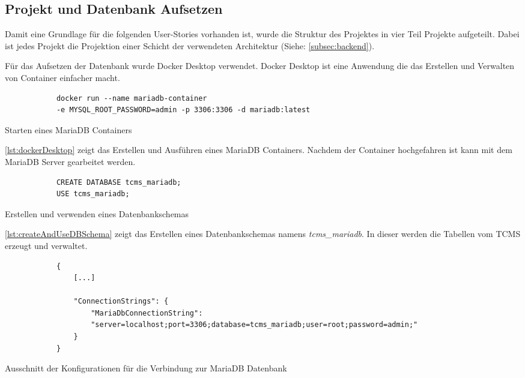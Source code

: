 \documentclass[a4paper, fontsize=11pt, parskip=half, twoside]{scrreprt}
\begin{document}
	\subsection{Projekt und Datenbank Aufsetzen}
	Damit eine Grundlage für die folgenden User-Stories vorhanden ist, wurde die Struktur des Projektes in vier Teil Projekte aufgeteilt.
	Dabei ist jedes Projekt die Projektion einer Schicht der verwendeten Architektur (Siehe: \autoref{subsec:backend}).
	
	Für das Aufsetzen der Datenbank wurde Docker Desktop verwendet.
	Docker Desktop ist eine Anwendung die das Erstellen und Verwalten von Container einfacher macht. \textcite{noauthor_docker_2022}
	
	\begin{listing}[ht]
		\begin{verbatim}
			docker run --name mariadb-container 
			-e MYSQL_ROOT_PASSWORD=admin -p 3306:3306 -d mariadb:latest
		\end{verbatim}
		\caption{Starten eines MariaDB Containers}
		\label{lst:dockerDesktop}
	\end{listing}

	\autoref{lst:dockerDesktop} zeigt das Erstellen und Ausführen eines MariaDB Containers.
	Nachdem der Container hochgefahren ist kann mit dem MariaDB Server gearbeitet werden.
	
	\begin{listing}[ht]
		\begin{verbatim}
			CREATE DATABASE tcms_mariadb; 
			USE tcms_mariadb;
		\end{verbatim}
		\caption{Erstellen und verwenden eines Datenbankschemas}
		\label{lst:createAndUseDBSchema}
	\end{listing}

	\autoref{lst:createAndUseDBSchema} zeigt das Erstellen eines Datenbankschemas namens \emph{tcms\_mariadb}. 
	In dieser werden die Tabellen vom \ac{TCMS} erzeugt und verwaltet.

	\begin{listing}[ht]
		\begin{verbatim}
			{
				[...]
				
				"ConnectionStrings": {
					"MariaDbConnectionString": 
					"server=localhost;port=3306;database=tcms_mariadb;user=root;password=admin;"
				}
			}
		\end{verbatim}
		\caption{Ausschnitt der Konfigurationen für die Verbindung zur MariaDB Datenbank}
		\label{lst:connectionConfigs}
	\end{listing}
\end{document}
